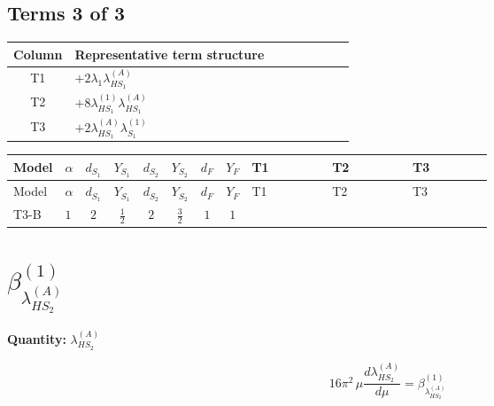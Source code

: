 \documentclass[8pt]{article}
\begin{document}
\begin{landscape}
\subsection*{Terms 3 of 3}
\begin{center}
\begin{tabular}{@{}c >{\raggedright\arraybackslash}p{0.82\linewidth}@{}}
\toprule
Column & Representative term structure \\
\midrule
T1 & \(\displaystyle +2 {\lambda_1} {\lambda_{HS_1}^{(A)}}\) \\
\midrule
T2 & \(\displaystyle +8 {\lambda_{HS_1}^{(1)}} {\lambda_{HS_1}^{(A)}}\) \\
\midrule
T3 & \(\displaystyle +2 {\lambda_{HS_1}^{(A)}} {\lambda_{S_1}^{(1)}}\) \\
\midrule
\bottomrule
\end{tabular}
\end{center}
\smallskip
\tiny
\begin{longtable}{@{}llcccccc >{\raggedright\arraybackslash}p{0.21\linewidth} >{\raggedright\arraybackslash}p{0.21\linewidth} >{\raggedright\arraybackslash}p{0.21\linewidth}@{}}
\toprule
Model & $\alpha$ & $d_{S_1}$ & $Y_{S_1}$ & $d_{S_2}$ & $Y_{S_2}$ & $d_F$ & $Y_F$ & T1 & T2 & T3 \\
\midrule
\endfirsthead
\toprule
Model & $\alpha$ & $d_{S_1}$ & $Y_{S_1}$ & $d_{S_2}$ & $Y_{S_2}$ & $d_F$ & $Y_F$ & T1 & T2 & T3 \\
\midrule
\endhead
T3-B & $1$ & $2$ & $\frac{1}{2}$ & $2$ & $\frac{3}{2}$ & $1$ & $1$ & \scriptsize\adjustbox{max width=\linewidth}{$\begin{gathered} +2 {\lambda_1} {\lambda_{HS_1}^{(A)}}\end{gathered}$} & \scriptsize\adjustbox{max width=\linewidth}{$\begin{gathered} +8 {\lambda_{HS_1}^{(1)}} {\lambda_{HS_1}^{(A)}}\end{gathered}$} & \scriptsize\adjustbox{max width=\linewidth}{$\begin{gathered} +2 {\lambda_{HS_1}^{(A)}} {\lambda_{S_1}^{(1)}}\end{gathered}$} \\
\midrule
\bottomrule
\end{longtable}
\clearpage
\section*{$\beta_{\lambda_{HS_2}^{(A)}}^{(1)}$}
\noindent\textbf{Quantity: }$\lambda_{HS_2}^{(A)}$\par\smallskip
\[16\pi^2\,\mu\frac{d \lambda_{HS_2}^{(A)}}{d\mu}=\beta_{\lambda_{HS_2}^{(A)}}^{(1)}\]

\end{landscape}
\end{document}
